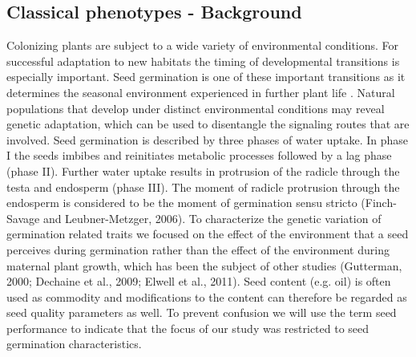 \documentclass[8pt, twoside, a5paper]{report}
\begin{document}
\subsection{Classical phenotypes - Background}
Colonizing plants are subject to a wide variety of environmental conditions. For successful adaptation to new habitats the timing 
of developmental transitions is especially important. Seed germination is one of these important transitions as it determines 
the seasonal environment experienced in further plant life \cite{Huang:2010}. Natural populations that develop under distinct 
environmental conditions may reveal genetic adaptation, which can be used to disentangle the signaling routes that are involved. 
Seed germination is described by three phases of water uptake. In phase I the seeds imbibes and reinitiates metabolic processes 
followed by a lag phase (phase II). Further water uptake results in protrusion of the radicle through the testa and endosperm 
(phase III). The moment of radicle protrusion through the endosperm is considered to be the moment of germination sensu stricto 
(Finch-Savage and Leubner-Metzger, 2006). To characterize the genetic variation of germination related traits we focused on the 
effect of the environment that a seed perceives during germination rather than the effect of the environment during maternal 
plant growth, which has been the subject of other studies (Gutterman, 2000; Dechaine et al., 2009; Elwell et al., 2011). Seed 
content (e.g. oil) is often used as commodity and modifications to the content can therefore be regarded as seed quality parameters 
as well. To prevent confusion we will use the term seed performance to indicate that the focus of our study was restricted to 
seed germination characteristics.
\end{document}
